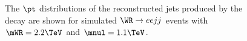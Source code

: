 \begin{figure}[btp]
	\centering
	\label{fig:wrJetPts}
	\caption{The $\pt$ distributions of the reconstructed jets produced by the \nul decay are shown for 
		simulated $\WR \rightarrow eejj$ events with $\mWR = 2.2 \TeV$ and $\mnul = 1.1 \TeV$.}
\end{figure}


